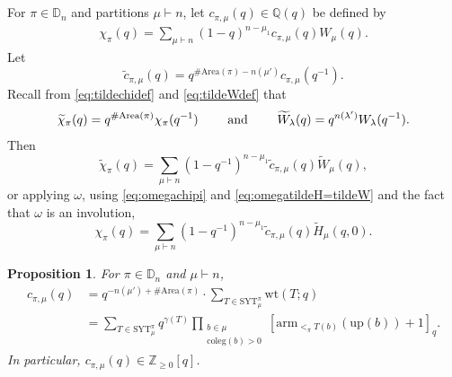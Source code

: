 \documentclass[12pt,reqno]{amsart}
\theoremstyle{plain}
\newtheorem{proposition}[theorem]{Proposition}
\theoremstyle{definition}
\theoremstyle{remark}
\theoremstyle{example}
\numberwithin{equation}{section}
\newcommand\QQ{\mathbb{Q}}
\newcommand\ZZ{\mathbb{Z}}
\newcommand\up{\mathrm{up}}
\newcommand\arm{\mathrm{arm}}
\newcommand{\coleg}{\mathrm{coleg}}
\newcommand{\SYT}{\mathrm{SYT}}
\newcommand{\wt}{\mathrm{wt}}
\newcommand{\Area}{\mathrm{Area}}
\newcommand{\DD}{\mathbb{D}}
\begin{document}
\subsection{}For $\pi \in \DD_n$ and partitions $\mu \vdash n$, let $c_{\pi,\mu}(q) \in \QQ(q)$ be defined by \begin{align}\label{eq:cpimudef}
	\chi_\pi(q) = \sum_{\mu \vdash n} (1-q)^{n-\mu_1} c_{\pi,\mu}(q) W_\mu(q).
\end{align}
Let \begin{equation}\label{eq:tildectoc}
	\widetilde{c}_{\pi,\mu}(q) = q^{\# \Area(\pi) - n(\mu')}c_{\pi,\mu}(q^{-1}).
\end{equation} Recall from \eqref{eq:tildechidef} and \eqref{eq:tildeWdef} that $$ \widetilde{\chi}_\pi(q) = q^{\# \Area(\pi)} \chi_\pi(q^{-1}) \qquad \hbox{ and } \qquad	\widetilde{W}_\lambda(q) = q^{n(\lambda')}W_\lambda(q^{-1}).$$  Then \begin{equation}
\widetilde{\chi}_\pi(q) = \sum_{\mu \vdash n}^{} (1-q^{-1})^{n-\mu_1} \widetilde{c}_{\pi,\mu}(q) \widetilde{W}_\mu(q),
\end{equation}  
or applying $\omega$, using \eqref{eq:omegachipi} and \eqref{eq:omegatildeH=tildeW} and the fact that $\omega$ is an involution, \begin{equation}\label{eq:tildecastildeHcoeff}
	\chi_\pi(q) = \sum_{\mu \vdash n}^{} (1-q^{-1})^{n-\mu_1} \widetilde{c}_{\pi,\mu}(q) \widetilde{H}_\mu(q,0).
\end{equation} 

\begin{proposition}\label{th:equalitywithVienna} 
	For $\pi \in \DD_n$ and $\mu \vdash n$,
	\begin{align}
		c_{\pi,\mu}(q) 
		&= q^{-n(\mu')+\#\Area(\pi)} \cdot \sum_{T \in \SYT_\mu^\pi} \wt(T;q) 
		\nonumber
		\\
		&= \sum_{T \in \SYT^\pi_\mu}  
		q^{\gamma(T)} \prod_{\substack{b \in \mu \\ \coleg(b)>0}} [\arm_{<_\pi T(b)}(\up(b))+1]_q.
	\end{align} In particular, $c_{\pi,\mu}(q) \in \ZZ_{\geq 0}[q]$.
\end{proposition}
\end{document}
